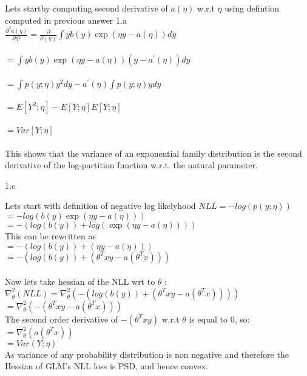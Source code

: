 \begin{answer}
\LARGE
Lets startby computing second derivative of $a(\eta)$ w.r.t $\eta$ using defintion computed in previous answer 1.a
\\
$ \frac {\partial^2 a(\eta)}{ \partial \eta^2}  = \frac{\partial}{\partial (\eta) }   \int  y b(y)\exp(\eta y - a(\eta)) dy $
\\   \\ 
$ =  \int  y b(y)\exp(\eta y - a(\eta)) (y-a^\prime(\eta)) dy$
\\   \\ 
$ =  \int p(y;\eta)y^2dy -a^\prime(\eta) \int p(y;\eta) ydy $
\\   \\ 
$ = E[Y^2;\eta] - E[Y;\eta] E[Y;\eta] $
\\   \\ 
$ = Var[Y;\eta] $ \\ \\
This shows that the variance of an exponential family distribution is the second derivative of the log-partition function w.r.t. the natural parameter.

\end{answer}
\clearpage

\LARGE
1.c
\normalsize

\begin{answer}
  \LARGE
  Lets start with definition of negative log likelyhood
  $ NLL = -log(p(y;\eta))$ \\
  $ = -log(b(y) \exp (\eta y- a(\eta))) $ \\
  $ = -(log(b(y)) + log(\exp(\eta y- a(\eta)))) $ \\ This can be rewritten as \\
  $ = -(log(b(y)) + (\eta y- a(\eta))) $ \\
  $ = -(log(b(y)) + (\theta^{T}xy- a(\theta^{T}x))) $ \\ \\ 
  Now lets take hessian of the NLL wrt to $\theta$ : \\
  $ \nabla^{2}_\theta(NLL) = \nabla^{2}_\theta ( -(log(b(y)) + (\theta^{T}xy- a(\theta^{T}x)))  ) $ \\
  $ = \nabla^{2}_\theta ( -(\theta^{T}xy- a(\theta^{T}x))) $ \\ 
  The second order derivative of $  -(\theta^{T}xy)$ w.r.t $\theta $ is equal to 0, so:\\
  $ =  \nabla^{2}_\theta (a(\theta^{T}x)) $ \\ 
  $ = Var(Y;\eta)$ \\
  As variance of any probability distribution is non negative and therefore the Hessian of GLM’s NLL loss is PSD, and hence convex.
  
\end{answer}
\clearpage

